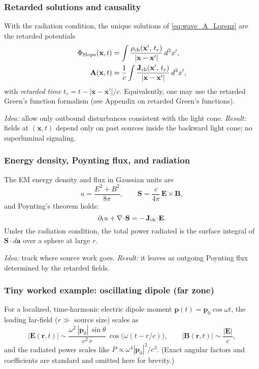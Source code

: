 \subsubsection{Retarded solutions and causality}
With the radiation condition, the unique solutions of \eqref{eq:wave_A_Lorenz} are the retarded potentials
\begin{align}
\Phi_{\text{Slope}}(\mathbf x,t) &= \int \frac{\rho_{\rm ch}(\mathbf x',\,t_r)}{|\mathbf x-\mathbf x'|}\,d^3x',\\
\mathbf A(\mathbf x,t) &= \frac{1}{c}\int \frac{\mathbf J_{\rm ch}(\mathbf x',\,t_r)}{|\mathbf x-\mathbf x'|}\,d^3x',
\end{align}
with \emph{retarded time} \(t_r=t-|\mathbf x-\mathbf x'|/c\).
Equivalently, one may use the retarded Green's function formalism (see Appendix on retarded Green's functions).

\noindent\emph{Idea:} allow only outbound disturbances consistent with the light cone. \;
\emph{Result:} fields at \((\mathbf x,t)\) depend only on past sources inside the backward light cone; no superluminal signaling.

\subsubsection{Energy density, Poynting flux, and radiation}
The EM energy density and flux in Gaussian units are
\begin{equation}
u = \frac{E^2+B^2}{8\pi}, \qquad \mathbf S = \frac{c}{4\pi}\,\mathbf E\times\mathbf B,
\end{equation}
and Poynting's theorem holds:
\begin{equation}
\partial_t u + \nabla\!\cdot\!\mathbf S = -\,\mathbf J_{\rm ch}\!\cdot\!\mathbf E.
\end{equation}
Under the radiation condition, the total power radiated is the surface integral of \(\mathbf S\cdot d\mathbf a\) over a sphere at large \(r\).

\noindent\emph{Idea:} track where source work goes. \;
\emph{Result:} it leaves as outgoing Poynting flux determined by the retarded fields.

\subsubsection{Tiny worked example: oscillating dipole (far zone)}
For a localized, time-harmonic electric dipole moment \( \mathbf p(t)=\mathbf p_0\cos\omega t\),
the leading far-field (\(r\gg\) source size) scales as
\begin{equation}
\big|\mathbf E(\mathbf r,t)\big| \sim \frac{\omega^2\,|\mathbf p_0|\,\sin\theta}{c^2\,r}\,
\cos\!\big(\omega(t-r/c)\big), \qquad
\big|\mathbf B(\mathbf r,t)\big| \sim \frac{|\mathbf E|}{c},
\end{equation}
and the radiated power scales like \(P \propto \omega^4 |\mathbf p_0|^2/c^3\).
(Exact angular factors and coefficients are standard and omitted here for brevity.)

